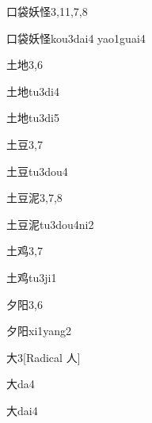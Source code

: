 \begin{entry}{口袋妖怪}{3,11,7,8}
  \begin{phonetics}{口袋妖怪}{kou3dai4 yao1guai4}
  \end{phonetics}
\end{entry}

\begin{entry}{土地}{3,6}
  \begin{phonetics}{土地}{tu3di4}
  \end{phonetics}
  \begin{phonetics}{土地}{tu3di5}
  \end{phonetics}
\end{entry}

\begin{entry}{土豆}{3,7}
  \begin{phonetics}{土豆}{tu3dou4}
  \end{phonetics}
\end{entry}

\begin{entry}{土豆泥}{3,7,8}
  \begin{phonetics}{土豆泥}{tu3dou4ni2}
  \end{phonetics}
\end{entry}

\begin{entry}{土鸡}{3,7}
  \begin{phonetics}{土鸡}{tu3ji1}
  \end{phonetics}
\end{entry}

\begin{entry}{夕阳}{3,6}
  \begin{phonetics}{夕阳}{xi1yang2}
  \end{phonetics}
\end{entry}

\begin{entry}{大}{3}[Radical ⼈]
  \begin{phonetics}{大}{da4}
  \end{phonetics}
  \begin{phonetics}{大}{dai4}
  \end{phonetics}
\end{entry}

